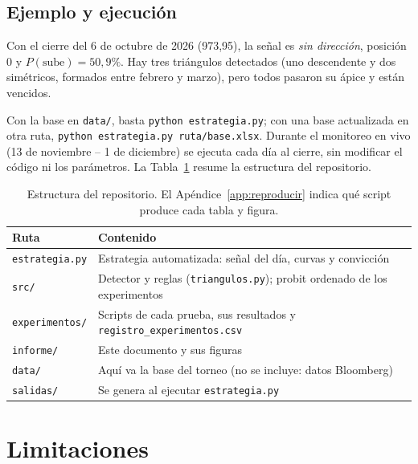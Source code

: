 \documentclass[10pt,a4paper]{article}
\begin{document}
\subsection{Ejemplo y ejecución}

Con el cierre del 6 de octubre de 2026 (973,95), la señal es \emph{sin dirección},
posición 0 y $P(\text{sube})=50{,}9\%$. Hay tres triángulos detectados (uno descendente
y dos simétricos, formados entre febrero y marzo), pero todos pasaron su ápice y están
vencidos.

Con la base en \texttt{data/}, basta \texttt{python estrategia.py}; con una base
actualizada en otra ruta, \texttt{python estrategia.py ruta/base.xlsx}. Durante el
monitoreo en vivo (13 de noviembre -- 1 de diciembre) se ejecuta cada día al cierre, sin
modificar el código ni los parámetros. La Tabla~\ref{tab:repo} resume la estructura del
repositorio.

\begin{table}[htb]\centering\small
\begin{tabular}{@{}ll@{}}
\toprule
Ruta & Contenido \\
\midrule
\texttt{estrategia.py}  & Estrategia automatizada: señal del día, curvas y convicción \\
\texttt{src/}           & Detector y reglas (\texttt{triangulos.py}); probit ordenado de los experimentos \\
\texttt{experimentos/}  & Scripts de cada prueba, sus resultados y \texttt{registro\_experimentos.csv} \\
\texttt{informe/}       & Este documento y sus figuras \\
\texttt{data/}          & Aquí va la base del torneo (no se incluye: datos Bloomberg) \\
\texttt{salidas/}       & Se genera al ejecutar \texttt{estrategia.py} \\
\bottomrule
\end{tabular}
\caption{Estructura del repositorio. El Apéndice~\ref{app:reproducir} indica qué script
produce cada tabla y figura.}\label{tab:repo}
\end{table}

\section{Limitaciones}\label{sec:limitaciones}
\end{document}
